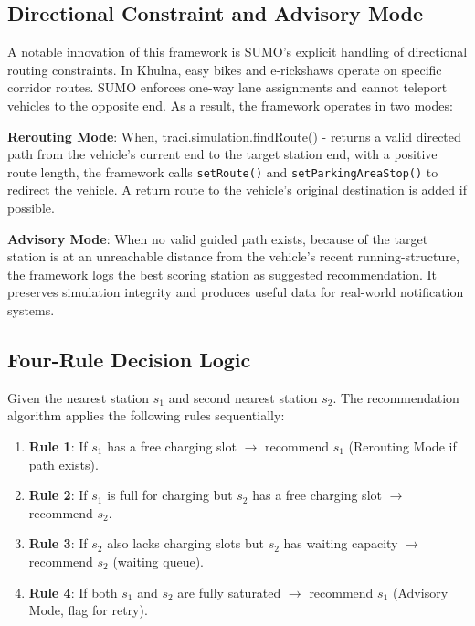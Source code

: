 \documentclass[conference]{IEEEtran}
\begin{document}
\subsection{Directional Constraint and Advisory Mode}

A notable innovation of this framework is SUMO's explicit handling of
directional routing constraints. In Khulna, easy bikes and e-rickshaws
operate on specific corridor routes. SUMO enforces one-way lane
assignments and cannot teleport vehicles to the opposite end. As a
result, the framework operates in two modes:

\textbf{Rerouting Mode}: When, {traci.simulation.findRoute()} -
returns a valid directed path from the vehicle's current end to the
target station end, with a positive route length, the framework calls
\texttt{setRoute()} and \texttt{setParkingAreaStop()} to redirect the
vehicle. A return route to the vehicle's original destination is added
if possible.

\textbf{Advisory Mode}: When no valid guided path exists, because of
the target station is at an unreachable distance from the vehicle's
recent running-structure, the framework logs the best scoring station
as suggested recommendation. It preserves simulation integrity and
produces useful data for real-world notification systems.

\subsection{Four-Rule Decision Logic}

Given the nearest station $s_1$ and second nearest station $s_2$. The
recommendation algorithm applies the following rules sequentially:
\begin{enumerate}
  \item \textbf{Rule 1}: If $s_1$ has a free charging slot $\rightarrow$
        recommend $s_1$ (Rerouting Mode if path exists).
  \item \textbf{Rule 2}: If $s_1$ is full for charging but $s_2$ has a
        free charging slot $\rightarrow$ recommend $s_2$.
  \item \textbf{Rule 3}: If $s_2$ also lacks charging slots but $s_2$
        has waiting capacity $\rightarrow$ recommend $s_2$ (waiting queue).
  \item \textbf{Rule 4}: If both $s_1$ and $s_2$ are fully saturated
        $\rightarrow$ recommend $s_1$ (Advisory Mode, flag for retry).
\end{enumerate}
\end{document}
